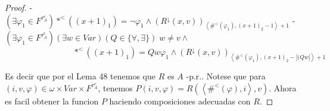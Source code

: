 \begin{proof}
    - $(\exists \varphi _{1}\in F^{\tau_{A}^{e}})\ast ^{< }((x+1)_{1})=\lnot \varphi _{1}\wedge (R^{\downarrow }(x,v))_{\left\langle \#^{< }(\varphi _{1}),(x+1)_{2}-1\right\rangle +1}$
    - $(\exists \varphi _{1}\in F^{\tau_{A}^{e}})(\exists w\in Var)(Q\in \{\forall ,\exists \})\;w\neq v\wedge $
    $\ \ \ \ \ \ \ \ \ \ \ \ \ \ \ \ \ \ \ \ \ \ \ \ \ \ \ \ \ \ \ \ \ \ \ \ \ \ast ^{< }((x+1)_{1})=Qw\varphi _{1}\wedge (R^{\downarrow }(x,v))_{\left\langle \#^{< }(\varphi _{1}),(x+1)_{2}-\left\vert (Qw\right\vert \right\rangle +1}$

    Es decir que por el Lema 48 tenemos que $R$ es $A$ -p.r.. Notese que para $(i,v,\varphi )\in \omega \times Var\times F^{\tau_{A}^{e}}$, tenemos $P(i,v,\varphi )=R(\left\langle \#^{< }(\varphi ),i\right\rangle ,v)$. Ahora es facil obtener la funcion $P$ haciendo composiciones adecuadas con $R$.
  \end{proof}

